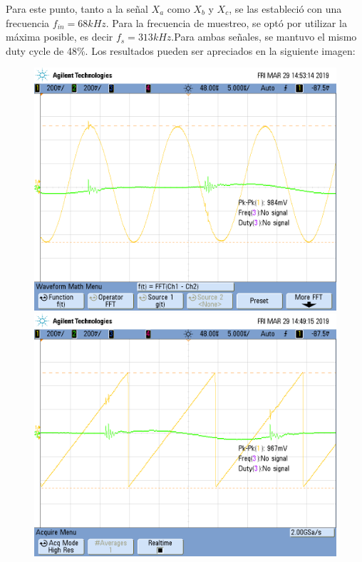 \documentclass[../../ASSD_TP1_G7.tex]{subfiles}
\begin{document}
Para este punto, tanto a la señal $X_{a}$ como $X_{b}$ y $X_{c}$,
se las estableció con una frecuencia $f_{in}=68kHz$. Para la frecuencia
de muestreo, se optó por utilizar la máxima posible, es decir $f_{s}=313kHz.$Para
ambas señales, se mantuvo el mismo duty cycle de 48\%. Los resultados
pueden ser apreciados en la siguiente imagen:

\begin{figure}[H]

\begin{centering}
\includegraphics[scale=0.25]{Imagenes/llave_senooo_pto_bf1}\includegraphics[scale=0.25]{Imagenes/llave_djente_pto_bfa}

\end{centering}
\end{figure}
\end{document}
